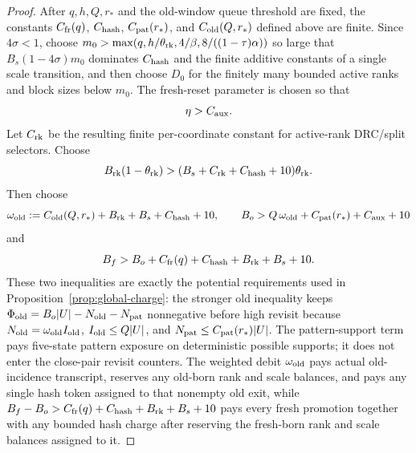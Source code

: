 \documentclass[11pt]{article}
\begin{document}
\begin{proof}
After $q,h,Q,r_*$ and the old-window queue threshold are fixed, the constants
$C_{\rm fr}(q)$, $C_{\rm hash}$, $C_{\rm pat}(r_*)$, and
$C_{\rm old}(Q,r_*)$ defined above are finite.  Since $4\sigma<1$, choose
$m_0>\max(q,h/\theta_{\rm rk},4/\beta,8/((1-\tau)\alpha))$ so large that
$B_s(1-4\sigma)m_0$ dominates $C_{\rm hash}$ and the finite additive constants
of a single scale transition, and then choose $D_0$ for the finitely many
bounded active ranks and block sizes below $m_0$.  The fresh-reset parameter is
chosen so that
\[
  \eta>C_{\rm aux}.
\]
Let $C_{\rm rk}$ be the resulting finite per-coordinate constant for
active-rank DRC/split selectors.  Choose
\[
  B_{\rm rk}(1-\theta_{\rm rk})
  >(B_s+C_{\rm rk}+C_{\rm hash}+10)\theta_{\rm rk}.
\]
Then choose
\[
  \omega_{\rm old}:=C_{\rm old}(Q,r_*)+B_{\rm rk}+B_s+C_{\rm hash}+10,
  \qquad
  B_o>Q\,\omega_{\rm old}+C_{\rm pat}(r_*)+C_{\rm aux}+10
\]
and
\[
  B_f>B_o+C_{\rm fr}(q)+C_{\rm hash}+B_{\rm rk}+B_s+10 .
\]
These two inequalities are exactly the potential requirements used in
Proposition~\ref{prop:global-charge}: the stronger old inequality keeps
$\Phi_{\rm old}=B_o|U|-N_{\rm old}-N_{\rm pat}$ nonnegative before high revisit
because $N_{\rm old}=\omega_{\rm old}I_{\rm old}$, $I_{\rm old}\le Q|U|$, and
$N_{\rm pat}\le C_{\rm pat}(r_*)|U|$.  The pattern-support term pays
five-state pattern exposure on deterministic possible supports; it does not
enter the close-pair revisit counters.  The weighted debit $\omega_{\rm old}$
pays actual old-incidence transcript, reserves any old-born rank and scale
balances, and pays any single hash token assigned to that nonempty old exit,
while
$B_f-B_o>C_{\rm fr}(q)+C_{\rm hash}+B_{\rm rk}+B_s+10$ pays every fresh
promotion together with any bounded hash charge after reserving the fresh-born
rank and scale balances assigned to it.


\end{proof}
\end{document}
